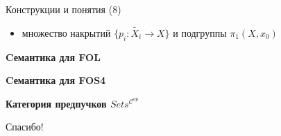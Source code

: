 \documentclass{beamer}
\begin{document}
\begin{frame}{Конструкции и понятия (8)}
\begin{itemize}
	\item множество накрытий $\{ p_i : \widetilde{X_i} \to X \}$ и подгруппы $\pi_1(X, x_0)$
\end{itemize}
\end{frame}



\begin{frame}{}
\begin{center}
	\textbf{Cемантика для FOL}
\end{center}
\end{frame}



\begin{frame}{}
\begin{center}
	\textbf{Cемантика для FOS4}
\end{center}
\end{frame}




\begin{frame}{}
\begin{center}
	\textbf{Категория предпучков $Sets^{\mathcal{C}^{op}}$}
\end{center}
\end{frame}



\begin{frame}{}
    \thispagestyle{empty}
    \begin{center}
        {\large Спасибо!}
    \end{center}
\end{frame}


\end{document}
